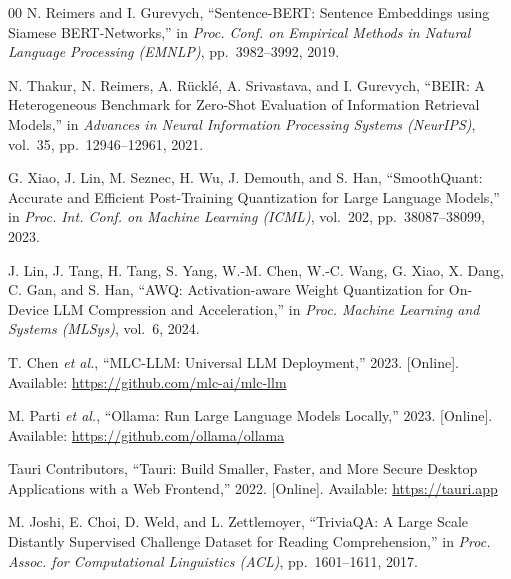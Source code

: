 \documentclass[conference]{IEEEtran}
\begin{document}
\begin{thebibliography}{00}
N. Reimers and I. Gurevych,
``Sentence-{BERT}: Sentence Embeddings using Siamese {BERT}-Networks,''
in \textit{Proc. Conf. on Empirical Methods in Natural Language Processing
(EMNLP)}, pp.~3982--3992, 2019.

N. Thakur, N. Reimers, A. R\"uckl{\'e}, A. Srivastava, and I. Gurevych,
``{BEIR}: A Heterogeneous Benchmark for Zero-Shot Evaluation of
Information Retrieval Models,''
in \textit{Advances in Neural Information Processing Systems (NeurIPS)},
vol.~35, pp.~12946--12961, 2021.

G. Xiao, J. Lin, M. Seznec, H. Wu, J. Demouth, and S. Han,
``{SmoothQuant}: Accurate and Efficient Post-Training Quantization for
Large Language Models,''
in \textit{Proc. Int. Conf. on Machine Learning (ICML)},
vol.~202, pp.~38087--38099, 2023.

J. Lin, J. Tang, H. Tang, S. Yang, W.-M. Chen, W.-C. Wang, G. Xiao,
X. Dang, C. Gan, and S. Han,
``{AWQ}: Activation-aware Weight Quantization for On-Device {LLM}
Compression and Acceleration,''
in \textit{Proc. Machine Learning and Systems (MLSys)}, vol.~6, 2024.

T. Chen \textit{et al.},
``{MLC-LLM}: Universal {LLM} Deployment,''
2023. [Online]. Available: \url{https://github.com/mlc-ai/mlc-llm}

M. Parti \textit{et al.},
``Ollama: Run Large Language Models Locally,''
2023. [Online]. Available: \url{https://github.com/ollama/ollama}

Tauri Contributors,
``Tauri: Build Smaller, Faster, and More Secure Desktop Applications
with a Web Frontend,''
2022. [Online]. Available: \url{https://tauri.app}

M. Joshi, E. Choi, D. Weld, and L. Zettlemoyer,
``TriviaQA: A Large Scale Distantly Supervised Challenge Dataset for
Reading Comprehension,''
in \textit{Proc. Assoc. for Computational Linguistics (ACL)},
pp.~1601--1611, 2017.

\end{thebibliography}
\end{document}

